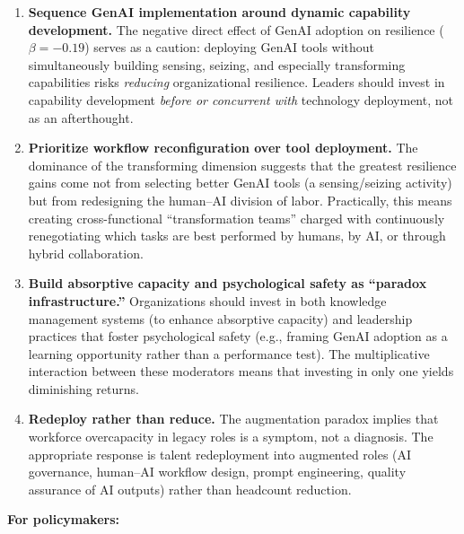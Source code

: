 \documentclass[12pt, a4paper]{article}
\begin{document}
\begin{enumerate}[nosep]
    \item \textbf{Sequence GenAI implementation around dynamic capability development.} The negative direct effect of GenAI adoption on resilience ($\beta = -0.19$) serves as a caution: deploying GenAI tools without simultaneously building sensing, seizing, and especially transforming capabilities risks \textit{reducing} organizational resilience. Leaders should invest in capability development \textit{before or concurrent with} technology deployment, not as an afterthought.

    \item \textbf{Prioritize workflow reconfiguration over tool deployment.} The dominance of the transforming dimension suggests that the greatest resilience gains come not from selecting better GenAI tools (a sensing/seizing activity) but from redesigning the human--AI division of labor. Practically, this means creating cross-functional ``transformation teams'' charged with continuously renegotiating which tasks are best performed by humans, by AI, or through hybrid collaboration.

    \item \textbf{Build absorptive capacity and psychological safety as ``paradox infrastructure.''} Organizations should invest in both knowledge management systems (to enhance absorptive capacity) and leadership practices that foster psychological safety (e.g., framing GenAI adoption as a learning opportunity rather than a performance test). The multiplicative interaction between these moderators means that investing in only one yields diminishing returns.

    \item \textbf{Redeploy rather than reduce.} The augmentation paradox implies that workforce overcapacity in legacy roles is a symptom, not a diagnosis. The appropriate response is talent redeployment into augmented roles (AI governance, human--AI workflow design, prompt engineering, quality assurance of AI outputs) rather than headcount reduction.
\end{enumerate}

\textbf{For policymakers:}
\end{document}
